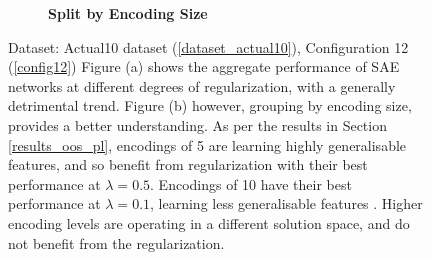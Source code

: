 \documentclass[a4paper,11pt,oneside]{article}
\theoremstyle{plain}
\theoremstyle{definition}
\begin{document}
\begin{figure}[H]
\begin{subfigure}{.49\textwidth}
		\caption{\textbf{Split by Encoding Size} 
			\newline }
		\label{figure-actual_sae_mse_by_encoding}
	\end{subfigure}
	\caption[SAE MSE by L1 Regularization]
	{Dataset: Actual10 dataset (\ref{dataset_actual10}), Configuration 12 (\ref{config12})
		\newline Figure (a) shows the aggregate performance of SAE networks at different degrees of regularization, with a generally detrimental trend. Figure (b) however, grouping by encoding size, provides a better understanding. As per the results in Section \ref{results_oos_pl}, encodings of 5 are learning highly generalisable features, and so benefit from regularization with their best performance at $\lambda = 0.5$. Encodings of 10 have their best performance at $\lambda = 0.1$, learning less generalisable features . Higher encoding levels are operating in a different solution space, and do not benefit from the regularization.
	}
	\label{figure-mse_reg}
\end{figure}
\end{document}
